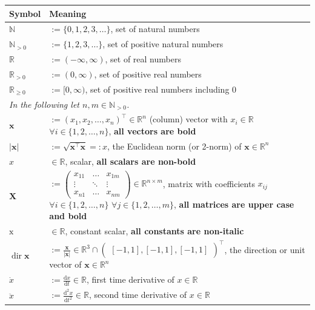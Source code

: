 \documentclass[journal]{IEEEtran}
\renewcommand{\c}{\mathrm} %
\renewcommand{\v}{\boldsymbol} %
\newcommand{\T}{\top} %
\renewcommand{\d}{\mathrm{d}} %
\newcommand{\F}[1]{\mathbb{#1}} %
\newcommand{\dir}{\operatorname{dir}} %
\begin{document}
{	\begin{longtable}[H]{p{3cm}p{11cm}}
				\textsf{\textbf{Symbol}}
			&
				\textsf{\textbf{Meaning}}
		\\\hline\endhead
				$\F{N}$
			&
				$:= \{0, 1, 2, 3, \dots\}$, set of natural numbers
		\\
				$\F{N}_{>0}$
			&
				$:= \{1, 2, 3, \dots\}$, set of positive natural numbers
		\\
				$\F{R}$
			&
				$:= (-\infty, \infty)$, set of real numbers
		\\
				$\F{R}_{> 0}$
			&
				$:= (0, \infty)$, set of positive real numbers
		\\
				$\F{R}_{\ge 0}$
			&
				$:= [0, \infty)$, set of positive real numbers including $0$
		\\\hline
			\multicolumn{2}{l}{\textit{In the following let $n, m \in \F{N}_{>0}$.}}
		\\
				$\v{x}$
			&
				$:= (x_1, x_2, \dots, x_n)^\T \in \F{R}^n$ (column) vector with $x_i \in \F{R}$ $\forall i \in \{1, 2, \dots, n\}$, \textbf{\textsf{all vectors are bold}}
		\\
				$|\v{x}|$
			&
				$:= \sqrt{\v{x}^\T \v{x}} =: x$, the Euclidean norm (or 2-norm) of $\v{x} \in \F{R}^n$
		\\
				$x$
			&
				$\in \F{R}$, scalar, \textbf{\textsf{all scalars are non-bold}}
		\\
				$\v{X}$
			&
				$:= \begin{pmatrix} x_{11} & \dots & x_{1m} \\ \vdots & \ddots & \vdots \\ x_{n1} & \dots & x_{nm} \end{pmatrix} \in \F{R}^{n \times m}$, matrix with coefficients $x_{ij}$ $\forall i \in \{1, 2, \dots, n\}$ $\forall j \in \{1, 2, \dots, m\}$, \textbf{\textsf{all matrices are upper case and bold}}
		\\
				$\c{x}$
			&
				$\in \F{R}$, constant scalar, \textbf{\textsf{all constants are non-italic}}
		\\
				$\dir \v{x}$
			&
				$:= \frac{\v{x}}{|\v{x}|} \in \F{R}^3 \cap \begin{pmatrix} [-1, 1] , [-1, 1] , [-1, 1] \end{pmatrix}^\T$, the direction or unit vector of $\v{x} \in \F{R}^n$
		\\
				$\dot x$
			&
				$:= \frac{\d x}{\d t} \in \F{R}$, first time derivative of $x \in \F{R}$
		\\
				$\ddot x$
			&
				$:= \frac{\d^2 x}{\d t^2} \in \F{R}$, second time derivative of $x \in \F{R}$

\end{longtable}}
\end{document}
